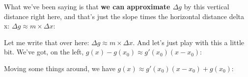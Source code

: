 \documentclass[pdftex, brazil, 12pt, twoside]{article}
\begin{document}
What we've been saying is that \textbf{we can approximate
$\Delta g$} by this vertical distance right here,
and that's just the slope times the horizontal distance delta x:
$\Delta g \approx m \times \Delta x$:

\begin{figure}[H]
  \begin{center}
  \end{center}
\end{figure}

Let me write that over here:
$\Delta g \approx m \times \Delta x$.
And let's just play with this a little bit.
We've got, on the left, $g(x) - g(x_0) \approx g'(x_0)(x - x_0)$:

\begin{figure}[H]
  \begin{center}
  \end{center}
\end{figure}

Moving some things around, we have
$g(x) \approx g'(x_0)(x - x_0) + g(x_0)$:
\end{document}
